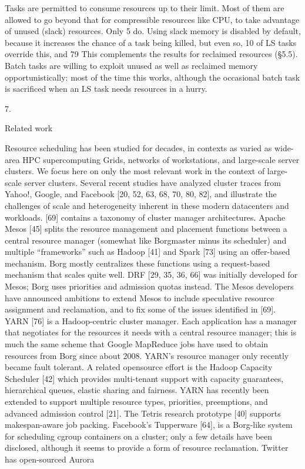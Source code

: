 Tasks are permitted to consume resources up to their
limit. Most of them are allowed to go beyond that for compressible resources like CPU, to take advantage of unused
(slack) resources. Only 5%
do. Using slack memory is disabled by default, because it increases the chance of a task being killed, but even so, 10%
of LS tasks override this, and 79%
This complements the results for reclaimed resources (§5.5).
Batch tasks are willing to exploit unused as well as reclaimed
memory opportunistically: most of the time this works, although the occasional batch task is sacrificed when an LS
task needs resources in a hurry.

7.

Related work

Resource scheduling has been studied for decades, in contexts as varied as wide-area HPC supercomputing Grids, networks of workstations, and large-scale server clusters. We
focus here on only the most relevant work in the context of
large-scale server clusters.
Several recent studies have analyzed cluster traces from
Yahoo!, Google, and Facebook [20, 52, 63, 68, 70, 80, 82],
and illustrate the challenges of scale and heterogeneity inherent in these modern datacenters and workloads. [69] contains a taxonomy of cluster manager architectures.
Apache Mesos [45] splits the resource management and
placement functions between a central resource manager
(somewhat like Borgmaster minus its scheduler) and multiple “frameworks” such as Hadoop [41] and Spark [73]
using an offer-based mechanism. Borg mostly centralizes
these functions using a request-based mechanism that scales
quite well. DRF [29, 35, 36, 66] was initially developed for
Mesos; Borg uses priorities and admission quotas instead.
The Mesos developers have announced ambitions to extend
Mesos to include speculative resource assignment and reclamation, and to fix some of the issues identified in [69].
YARN [76] is a Hadoop-centric cluster manager. Each application has a manager that negotiates for the resources it
needs with a central resource manager; this is much the same
scheme that Google MapReduce jobs have used to obtain
resources from Borg since about 2008. YARN’s resource
manager only recently became fault tolerant. A related opensource effort is the Hadoop Capacity Scheduler [42] which
provides multi-tenant support with capacity guarantees, hierarchical queues, elastic sharing and fairness. YARN has recently been extended to support multiple resource types, priorities, preemptions, and advanced admission control [21].
The Tetris research prototype [40] supports makespan-aware
job packing.
Facebook’s Tupperware [64], is a Borg-like system for
scheduling cgroup containers on a cluster; only a few details
have been disclosed, although it seems to provide a form
of resource reclamation. Twitter has open-sourced Aurora

